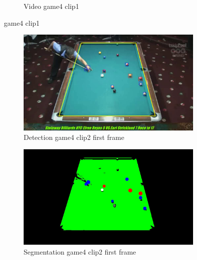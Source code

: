 \begin{figure}[H]
\begin{subfigure}[b]{0.48\textwidth}
    	\caption{Video game4 clip1}
    	\label{fig: game4_clip1_video}
    \end{subfigure}
    
	\caption{game4 clip1}
\end{figure}


\begin{figure}[H]
    \centering
    \begin{subfigure}[b]{0.48\textwidth}
        \centering
        \includegraphics[width=\textwidth]{images/Detection/game4_clip2_detected_balls_first_frame.jpg}
        \caption{Detection game4 clip2 first frame}
        \label{fig: game4_clip2_first_frame_detected}
    \end{subfigure}
    \begin{subfigure}[b]{0.48\textwidth}
        \centering
        \includegraphics[width=\textwidth]{images/Segmentation/game4_clip2_segmented_balls_first_frame.jpg}
        \caption{Segmentation game4 clip2 first frame}
		\label{fig: game4_clip2_first_frame_segmented}
    \end{subfigure}
    \begin{subfigure}[b]{0.48\textwidth}

\end{subfigure}
\end{figure}
